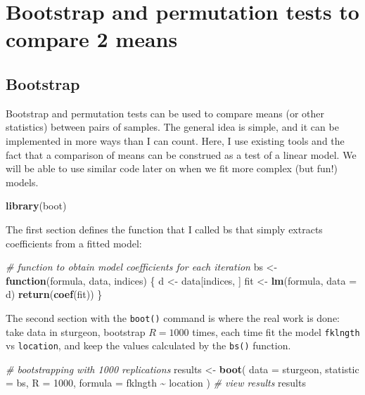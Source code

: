 \documentclass[
  12pt,
]{book}
\newenvironment{Shaded}{\begin{snugshade}}{\end{snugshade}}
\newcommand{\CommentTok}[1]{\textcolor[rgb]{0.56,0.35,0.01}{\textit{#1}}}
\newcommand{\ControlFlowTok}[1]{\textcolor[rgb]{0.13,0.29,0.53}{\textbf{#1}}}
\newcommand{\DataTypeTok}[1]{\textcolor[rgb]{0.13,0.29,0.53}{#1}}
\newcommand{\DecValTok}[1]{\textcolor[rgb]{0.00,0.00,0.81}{#1}}
\newcommand{\KeywordTok}[1]{\textcolor[rgb]{0.13,0.29,0.53}{\textbf{#1}}}
\newcommand{\NormalTok}[1]{#1}
\newcommand{\OperatorTok}[1]{\textcolor[rgb]{0.81,0.36,0.00}{\textbf{#1}}}
\newcommand{\StringTok}[1]{\textcolor[rgb]{0.31,0.60,0.02}{#1}}
\begin{document}
\hypertarget{bootstrap-and-permutation-tests-to-compare-2-means}{%
\section{Bootstrap and permutation tests to compare 2 means}\label{bootstrap-and-permutation-tests-to-compare-2-means}}

\hypertarget{bootstrap}{%
\subsection{Bootstrap}\label{bootstrap}}

Bootstrap and permutation tests can be used to compare means (or other statistics) between pairs of samples. The general idea is simple, and it can be implemented in more ways than I can count. Here, I use existing tools and the fact that a comparison of means can be construed as a test of a linear model. We will be able to use similar code later on when we fit more complex (but fun!) models.

\begin{Shaded}
\begin{Highlighting}[]
\KeywordTok{library}\NormalTok{(boot)}
\end{Highlighting}
\end{Shaded}

The first section defines the function that I called bs that simply extracts coefficients from a fitted model:

\begin{Shaded}
\begin{Highlighting}[]
\CommentTok{\# function to obtain model coefficients for each iteration}
\NormalTok{bs \textless{}{-}}\StringTok{ }\ControlFlowTok{function}\NormalTok{(formula, data, indices) \{}
\NormalTok{  d \textless{}{-}}\StringTok{ }\NormalTok{data[indices, ]}
\NormalTok{  fit \textless{}{-}}\StringTok{ }\KeywordTok{lm}\NormalTok{(formula, }\DataTypeTok{data =}\NormalTok{ d)}
  \KeywordTok{return}\NormalTok{(}\KeywordTok{coef}\NormalTok{(fit))}
\NormalTok{\}}
\end{Highlighting}
\end{Shaded}

The second section with the \texttt{boot()} command is where the real work is done: take data in sturgeon, bootstrap \(R = 1000\) times, each time fit the model \texttt{fklngth} vs \texttt{location}, and keep the values calculated by the \texttt{bs()} function.

\begin{Shaded}
\begin{Highlighting}[]
\CommentTok{\# bootstrapping with 1000 replications}
\NormalTok{results \textless{}{-}}\StringTok{ }\KeywordTok{boot}\NormalTok{(}
  \DataTypeTok{data =}\NormalTok{ sturgeon, }\DataTypeTok{statistic =}\NormalTok{ bs, }\DataTypeTok{R =} \DecValTok{1000}\NormalTok{,}
  \DataTypeTok{formula =}\NormalTok{ fklngth }\OperatorTok{\textasciitilde{}}\StringTok{ }\NormalTok{location}
\NormalTok{)}
\CommentTok{\# view results}
\NormalTok{results}
\end{Highlighting}
\end{Shaded}
\end{document}
